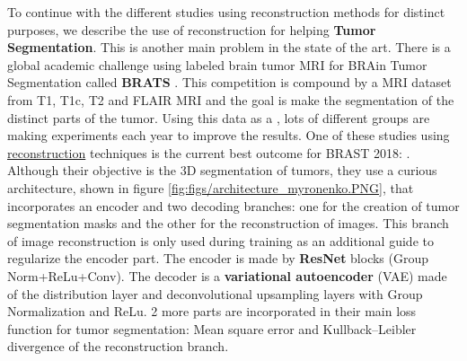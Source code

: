 To continue with the different studies using reconstruction methods for distinct purposes, we describe the use of reconstruction for helping \textbf{Tumor Segmentation}. This is another main problem in the state of the art. There is a global academic challenge using labeled brain tumor MRI for BRAin Tumor Segmentation called \textbf{BRATS} \cite{brats2014}. This competition is compound by a MRI dataset from T1, T1c, T2 and FLAIR MRI and the goal is make the segmentation of the distinct parts of the tumor. Using this data as a , lots of different groups are making experiments each year to improve the results. One of these studies using \underline{reconstruction} techniques is the current best outcome for BRAST 2018: . Although their objective is the 3D segmentation of tumors, they use a curious architecture, shown in figure \ref{fig:figs/architecture_myronenko.PNG}, that incorporates an encoder and two decoding branches: one for the creation of tumor segmentation masks and the other for the reconstruction of images. This branch of image reconstruction is only used during training as an additional guide to regularize  the encoder part. The encoder is made by \textbf{ResNet} blocks (Group Norm+ReLu+Conv). The decoder is a \textbf{variational autoencoder} (VAE) made of the distribution layer and deconvolutional upsampling layers with Group Normalization and ReLu.
2 more parts are incorporated in their main loss function for tumor segmentation: Mean square error and Kullback–Leibler divergence of the reconstruction branch.


